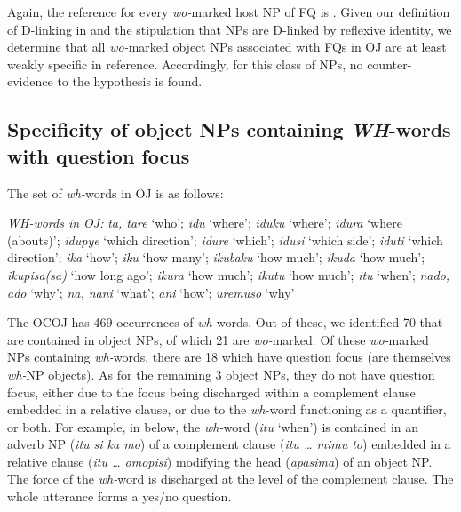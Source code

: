 \documentclass[output=paper]{LSP/langsci}
\begin{document}
Again, the reference for every \textit{wo-}marked host NP of FQ is . Given our definition of D-linking in  and the stipulation that  NPs are D-linked by reflexive identity, we determine that all \textit{wo-}marked object NPs associated with FQs in OJ   are at least weakly specific in reference. Accordingly, for this class of NPs, no counter-evidence to the hypothesis is found. 

\newpage 
\subsection{Specificity of object NPs containing \textit{WH}-words with question focus}
\label{07-fr-sec:2-2}

The set of \textit{wh-}words in OJ   is as follows: 

\begin{exe}
\ex%
\label{07-fr-ex:12}
\textit{WH-words in OJ:}\textit{ ta, tare} ‘who’;
\textit{idu} ‘where’; \textit{iduku} ‘where’; \textit{idura} ‘where
(abouts)’; \textit{idupye} ‘which direction’; \textit{idure} ‘which’;
\textit{idusi} ‘which side’; \textit{iduti} ‘which direction’;
\textit{ika} ‘how’; \textit{iku} ‘how many’; \textit{ikubaku}
‘how much’; \textit{ikuda} ‘how much’; \textit{ikupisa(sa)} ‘how long
ago’; \textit{ikura} ‘how much’; \textit{ikutu} ‘how much’;
\textit{itu} ‘when’; \textit{nado, ado} ‘why’; \textit{na, nani}
‘what’; \textit{ani} ‘how’; \textit{uremuso} ‘why’
\end{exe}

The OCOJ has 469 occurrences of \textit{wh-}words. Out of these, we identified 70 that are contained in object NPs, of which 21 are \textit{wo-}marked. Of these \textit{wo-}marked NPs containing \textit{wh-}words, there are 18 which have question focus (\ie are themselves \textit{wh-}NP objects). As for the remaining 3 object NPs, they do not have question focus, either due to the focus being discharged within a complement clause embedded in a relative clause, or due to the \textit{wh-}word functioning as a quantifier, or both. For example, in  below, the \textit{wh-}word (\textit{itu} ‘when’) is contained in an adverb NP (\textit{itu si ka mo}) of a complement clause (\textit{itu … mimu to}) embedded in a relative clause (\textit{itu … omopisi}) modifying the head (\textit{apasima}) of an object NP. The force of the \textit{wh-}word is discharged at the level of the complement clause. The whole utterance forms a yes/no question. 
\end{document}

